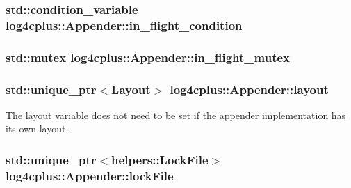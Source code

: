 \hypertarget{classlog4cplus_1_1Appender_a51e410648dd416ae749371e433482106}{
\subsubsection[{in\-\_\-flight\-\_\-condition}]{\setlength{\rightskip}{0pt plus 5cm}std\-::condition\-\_\-variable log4cplus\-::\-Appender\-::in\-\_\-flight\-\_\-condition\hspace{0.3cm}{\ttfamily [protected]}}}\label{classlog4cplus_1_1Appender_a51e410648dd416ae749371e433482106}
\hypertarget{classlog4cplus_1_1Appender_a02d36e4e8e82d352341cd5115f32cc0c}{
\subsubsection[{in\-\_\-flight\-\_\-mutex}]{\setlength{\rightskip}{0pt plus 5cm}std\-::mutex log4cplus\-::\-Appender\-::in\-\_\-flight\-\_\-mutex\hspace{0.3cm}{\ttfamily [protected]}}}\label{classlog4cplus_1_1Appender_a02d36e4e8e82d352341cd5115f32cc0c}
\hypertarget{classlog4cplus_1_1Appender_a54860ac05a751b1c3537458edc57b84a}{
\subsubsection[{layout}]{\setlength{\rightskip}{0pt plus 5cm}std\-::unique\-\_\-ptr$<${\bf Layout}$>$ log4cplus\-::\-Appender\-::layout\hspace{0.3cm}{\ttfamily [protected]}}}\label{classlog4cplus_1_1Appender_a54860ac05a751b1c3537458edc57b84a}
The layout variable does not need to be set if the appender implementation has its own layout. \hypertarget{classlog4cplus_1_1Appender_aba357bf52f47fa29747015e421ce6c92}{
\subsubsection[{lock\-File}]{\setlength{\rightskip}{0pt plus 5cm}std\-::unique\-\_\-ptr$<${\bf helpers\-::\-Lock\-File}$>$ log4cplus\-::\-Appender\-::lock\-File\hspace{0.3cm}{\ttfamily [protected]}}}\label{classlog4cplus_1_1Appender_aba357bf52f47fa29747015e421ce6c92}


